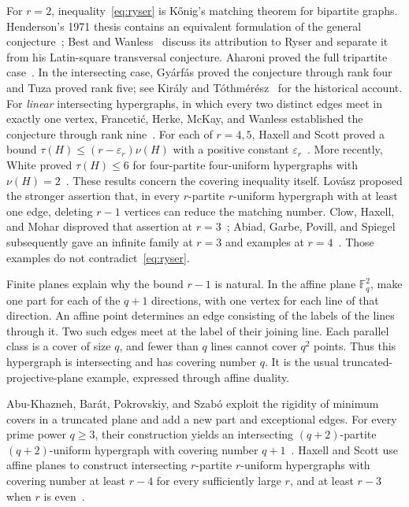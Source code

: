 \documentclass[11pt]{article}
\theoremstyle{definition}
\theoremstyle{remark}
\newcommand{\F}{\mathbb F}
\begin{document}
For $r=2$, inequality~\eqref{eq:ryser} is K\H{o}nig's matching theorem
for bipartite graphs. Henderson's 1971 thesis contains an equivalent
formulation of the general conjecture~\cite{Henderson1971}; Best and
Wanless~\cite{BestWanless2018} discuss its attribution to Ryser and
separate it from his Latin-square transversal conjecture.
Aharoni proved the full tripartite case~\cite{Aharoni2001}.
In the intersecting case, Gy\'arf\'as proved the conjecture through rank
four and Tuza proved rank five; see
Kir\'aly and T\'othm\'er\'esz~\cite{KiralyTothmeresz2017} for the
historical account. For \emph{linear} intersecting hypergraphs, in which
every two distinct edges meet in exactly one vertex, Franceti\'c, Herke,
McKay, and Wanless established the conjecture through rank
nine~\cite{FranceticHerkeMcKayWanless2017}.
For each of $r=4,5$, Haxell and Scott proved a bound
$\tau(H)\le(r-\varepsilon_r)\nu(H)$ with a positive constant
$\varepsilon_r$~\cite{HaxellScott2012}. More recently, White proved
$\tau(H)\le6$ for four-partite four-uniform hypergraphs with
$\nu(H)=2$~\cite{White2026}.
These results concern the covering inequality itself. Lov\'asz proposed
the stronger assertion that, in every $r$-partite $r$-uniform hypergraph
with at least one edge, deleting $r-1$ vertices can reduce the matching number.
Clow, Haxell, and Mohar disproved that assertion at
$r=3$~\cite{ClowHaxellMohar2025}; Abiad, Garbe, Povill, and Spiegel
subsequently gave an infinite family at $r=3$ and examples at
$r=4$~\cite{AbiadGarbePovillSpiegel2025}. Those examples do not
contradict~\eqref{eq:ryser}.

Finite planes explain why the bound $r-1$ is natural. In the affine plane
$\F_q^2$, make one part for each of the $q+1$ directions, with one vertex
for each line of that direction. An affine point determines an edge
consisting of the labels of the lines through it. Two such edges meet at
the label of their joining line. Each parallel class is a cover of size
$q$, and fewer than $q$ lines cannot cover $q^2$ points. Thus this
hypergraph is intersecting and has covering number $q$. It is the usual
truncated-projective-plane example, expressed through affine duality.

Abu-Khazneh, Bar\'at, Pokrovskiy, and Szab\'o exploit the rigidity of
minimum covers in a truncated plane and add a new part and exceptional
edges. For every prime power $q\ge3$, their construction yields an
intersecting $(q+2)$-partite $(q+2)$-uniform hypergraph with covering
number $q+1$~\cite[Theorem~1.2, Lemma~1.3, Corollary~1.4]{AbuKhaznehBaratPokrovskiySzabo2019}.
Haxell and Scott use affine planes to construct intersecting $r$-partite
$r$-uniform hypergraphs with covering number at least $r-4$ for every
sufficiently large $r$, and at least $r-3$ when $r$ is
even~\cite[Theorem~6]{HaxellScott2017}.
\end{document}

